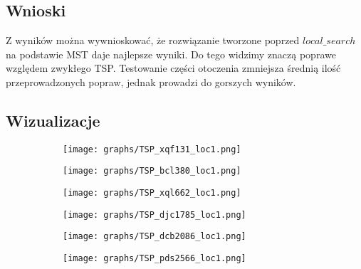 \documentclass{article}
\def\v{0.4}
\begin{document}
\subsection*{Wnioski}
	Z wyników można wywnioskować, że rozwiązanie tworzone poprzed $local\_search$ na podstawie MST daje najlepsze wyniki. Do tego widzimy znaczą poprawe względem zwykłego TSP. Testowanie części otoczenia zmniejsza średnią ilość przeprowadzonych popraw, jednak prowadzi do gorszych wyników.

\clearpage

\subsection*{Wizualizacje}
    \begin{figure}[h!]
		\centering
		\begin{subfigure}[b]{\v\linewidth}
			\texttt{[image: graphs/TSP\_xqf131\_loc1.png]}
		\end{subfigure}
		\begin{subfigure}[b]{\v\linewidth}
			\texttt{[image: graphs/TSP\_bcl380\_loc1.png]}
		\end{subfigure}
		\begin{subfigure}[b]{\v\linewidth}
			\texttt{[image: graphs/TSP\_xql662\_loc1.png]}
		\end{subfigure}
		\begin{subfigure}[b]{\v\linewidth}
			\texttt{[image: graphs/TSP\_djc1785\_loc1.png]}
		\end{subfigure}
		\begin{subfigure}[b]{\v\linewidth}
			\texttt{[image: graphs/TSP\_dcb2086\_loc1.png]}
		\end{subfigure}
		\begin{subfigure}[b]{\v\linewidth}
			\texttt{[image: graphs/TSP\_pds2566\_loc1.png]}
		\end{subfigure}
	\end{figure}
\end{document}
